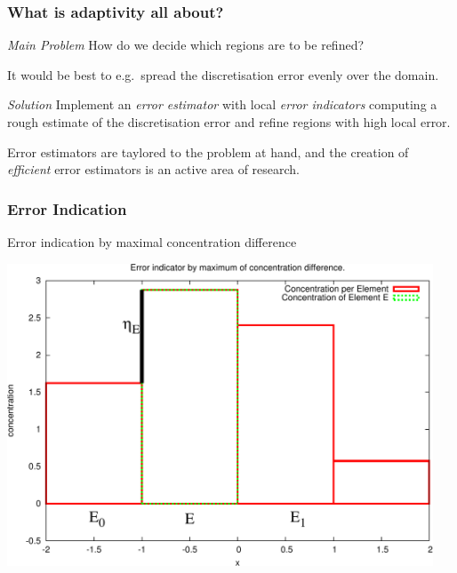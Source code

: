 \begin{frame}
  \frametitle<presentation>{What is adaptivity all about?}
  \begin{block}{\emph{Main Problem}}
    How do we decide which regions are to be refined?

    It would be best to e.g.~spread the discretisation error evenly over the domain.
  \end{block}

  \pause
  \begin{block}{\emph{Solution}}
    Implement an \emph{\emph{error estimator}} with local \emph{\emph{error indicators}} computing a rough estimate of the discretisation error and refine regions with high local error.
  \end{block}

  Error estimators are taylored to the problem at hand, and the creation of \emph{efficient} error estimators is an active area of research.
\end{frame}

\begin{frame}[fragile]
  \frametitle<presentation>{Error Indication}

  \begin{center}
    \begin{minipage}{0.75\textwidth}
      \begin{center}
        Error indication by maximal concentration difference

        \includegraphics[width=0.95\textwidth]{EPS/adaptivity/errind_maxconc}
      \end{center}
    \end{minipage}
  \end{center}
\end{frame}

